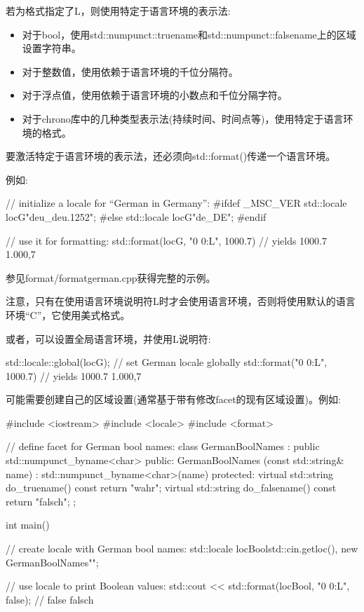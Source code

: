 若为格式指定了L，则使用特定于语言环境的表示法:

\begin{itemize}
\item 
对于bool，使用std::numpunct::truename和std::numpunct::falsename上的区域设置字符串。

\item 
对于整数值，使用依赖于语言环境的千位分隔符。

\item 
对于浮点值，使用依赖于语言环境的小数点和千位分隔字符。

\item 
对于chrono库中的几种类型表示法(持续时间、时间点等)，使用特定于语言环境的格式。
\end{itemize}

要激活特定于语言环境的表示法，还必须向std::format()传递一个语言环境。

例如:

\begin{cpp}
// initialize a locale for “German in Germany”:
#ifdef _MSC_VER
std::locale locG{"deu_deu.1252"};
#else
std::locale locG{"de_DE"};
#endif

// use it for formatting:
std::format(locG, "{0} {0:L}", 1000.7) // yields 1000.7 1.000,7
\end{cpp}

参见format/formatgerman.cpp获得完整的示例。

注意，只有在使用语言环境说明符L时才会使用语言环境，否则将使用默认的语言环境“C”，它使用美式格式。

或者，可以设置全局语言环境，并使用L说明符:

\begin{cpp}
std::locale::global(locG); // set German locale globally
std::format("{0} {0:L}", 1000.7) // yields 1000.7 1.000,7
\end{cpp}

可能需要创建自己的区域设置(通常基于带有修改facet的现有区域设置)。例如:


\begin{cpp}
#include <iostream>
#include <locale>
#include <format>

// define facet for German bool names:
class GermanBoolNames : public std::numpunct_byname<char> {
	public:
	GermanBoolNames (const std::string& name)
	: std::numpunct_byname<char>(name) {
	}
	protected:
	virtual std::string do_truename() const {
		return "wahr";
	}
	virtual std::string do_falsename() const {
		return "falsch";
	}
};

int main()
{
	// create locale with German bool names:
	std::locale locBool{std::cin.getloc(),
						new GermanBoolNames{""}};
						
	// use locale to print Boolean values:
	std::cout << std::format(locBool, "{0} {0:L}\n", false); // false falsch
}
\end{cpp}

